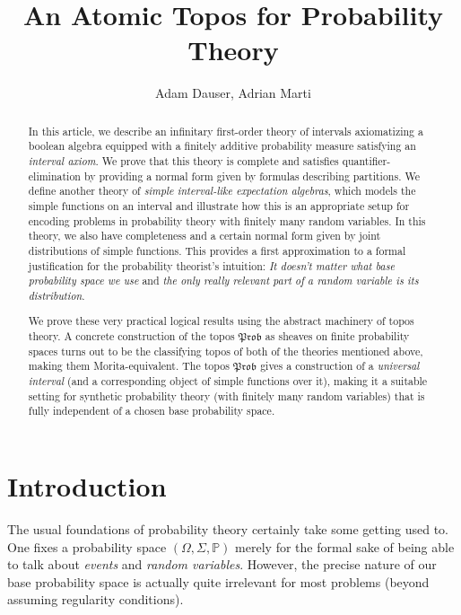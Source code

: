 \documentclass[a4paper]{amsproc}
\title{An Atomic Topos for Probability Theory}
\author{Adam Dauser, Adrian Marti}
\date{}
\theoremstyle{plain}
\theoremstyle{definition}
\theoremstyle{remark}
\numberwithin{equation}{section}
\newcommand{\Prob}{\mathfrak{Prob}}
\begin{document}
\begin{abstract}
In this article, we describe an infinitary first-order theory of intervals axiomatizing a boolean algebra equipped with a finitely additive probability measure satisfying an \emph{interval axiom}. We prove that this theory is complete and satisfies quantifier-elimination by providing a normal form given by formulas describing partitions. We define another theory of \emph{simple interval-like expectation algebras}, which models the simple functions on an interval and illustrate how this is an appropriate setup for encoding problems in probability theory with finitely many random variables. In this theory, we also have completeness and a certain normal form given by joint distributions of simple functions. This provides a first approximation to a formal justification for the probability theorist's intuition: \emph{It doesn't matter what base probability space we use} and \emph{the only really relevant part of a random variable is its distribution}.

We prove these very practical logical results using the abstract machinery of topos theory. A concrete construction of the topos $\Prob$ as sheaves on finite probability spaces turns out to be the classifying topos of both of the theories mentioned above, making them Morita-equivalent. The topos $\Prob$ gives a construction of a \emph{universal interval} (and a corresponding object of simple functions over it), making it a suitable setting for synthetic probability theory (with finitely many random variables) that is fully independent of a chosen base probability space.
\end{abstract}

\maketitle

\tableofcontents


\section{Introduction}

The usual foundations of probability theory certainly take some getting used to. One fixes a probability space $(\Omega,\Sigma, \mathbb{P})$ merely for the formal sake of being able to talk about \emph{events} and \emph{random variables}. However, the precise nature of our base probability space is actually quite irrelevant for most problems (beyond assuming regularity conditions).
\end{document}
